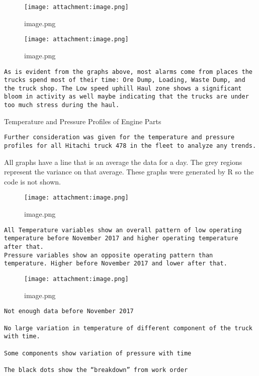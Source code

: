 \documentclass[11pt]{article}
\makeatletter
\def\maxwidth{\ifdim\Gin@nat@width>\linewidth\linewidth
    \else\Gin@nat@width\fi}
\let\Oldincludegraphics\includegraphics
\renewcommand{\includegraphics}[1]{\Oldincludegraphics[width=.8\maxwidth]{#1}}
\makeatother
\begin{document}
    \begin{figure}
\centering
\texttt{[image: attachment:image.png]}
\caption{image.png}
\end{figure}

    \begin{figure}
\centering
\texttt{[image: attachment:image.png]}
\caption{image.png}
\end{figure}

    \begin{verbatim}
As is evident from the graphs above, most alarms come from places the trucks spend most of their time: Ore Dump, Loading, Waste Dump, and the truck shop. The Low speed uphill Haul zone shows a significant bloom in activity as well maybe indicating that the trucks are under too much stress during the haul. 
\end{verbatim}

Temperature and Pressure Profiles of Engine Parts

\begin{verbatim}
Further consideration was given for the temperature and pressure profiles for all Hitachi truck 478 in the fleet to analyze any trends.
\end{verbatim}

    All graphs have a line that is an average the data for a day. The grey
regions represent the variance on that average. These graphs were
generated by R so the code is not shown.

    \begin{figure}
\centering
\texttt{[image: attachment:image.png]}
\caption{image.png}
\end{figure}

    \begin{verbatim}
All Temperature variables show an overall pattern of low operating temperature before November 2017 and higher operating temperature after that.
Pressure variables show an opposite operating pattern than temperature. Higher before November 2017 and lower after that. 
\end{verbatim}

    \begin{figure}
\centering
\texttt{[image: attachment:image.png]}
\caption{image.png}
\end{figure}

    \begin{verbatim}
Not enough data before November 2017

No large variation in temperature of different component of the truck with time.

Some components show variation of pressure with time 

The black dots show the “breakdown” from work order
\end{verbatim}
\end{document}
